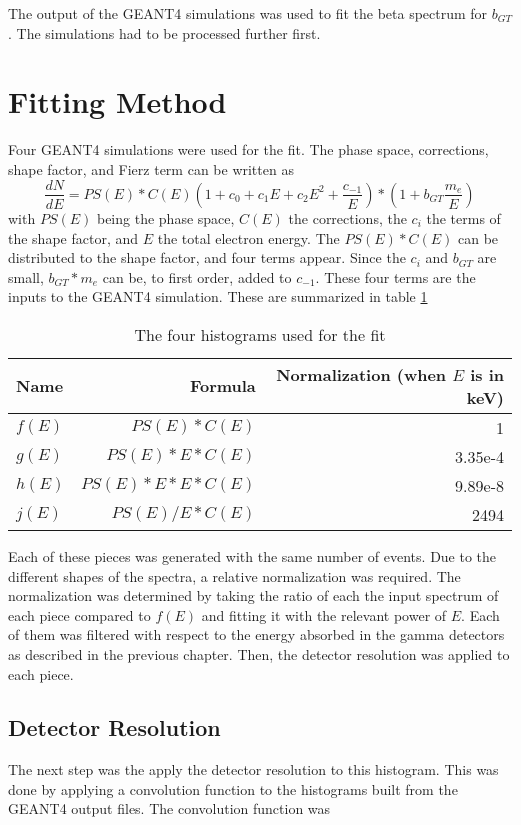 \documentclass[../MaxHughesThesis.tex]{subfiles}
\begin{document}
The output of the GEANT4 simulations was used to fit the beta spectrum for $b_{GT}$.
The simulations had to be processed further first.  

\section{Fitting Method}
Four GEANT4 simulations were used for the fit.
The phase space, corrections, shape factor, and Fierz term can be written as
\begin{equation}
	\frac{dN}{dE}= PS(E) * C(E) (1 + c_{0} + c_{1} E + c_{2} E^{2} + \frac{c_{-1}}{E}) * (1 + b_{GT}\frac{m_{e}}{E})
	\label{eq:betaspecwshape}
\end{equation}
with $PS(E)$ being the phase space, $C(E)$ the corrections, the $c_{i}$ the terms of the shape factor, and $E$ the total electron energy. 
The $PS(E)*C(E)$ can be distributed to the shape factor, and four terms appear.
Since the $c_{i}$ and $b_{GT}$ are small, $b_{GT}*m_{e}$ can be, to first order, added to $c_{-1}$. 
These four terms are the inputs to the GEANT4 simulation.
These are summarized in table \ref{tab:4histfit}

\begin{table}[!hbt]
	\centering
	\caption{The four histograms used for the fit}
		\begin{tabular}{lrr}
		Name & Formula & Normalization (when $E$ is in keV) \\ \hline
		$f(E)$ & $PS(E) * C(E)$ & 1 \\
		$g(E)$ & $PS(E) * E * C(E)$ & 3.35e-4 \\
		$h(E)$ &  $PS(E)  * E * E * C(E)$ & 9.89e-8 \\
		$j(E)$ &  $PS(E)/E * C(E)$ & 2494 
		\end{tabular}
		\label{tab:4histfit}
\end{table}

Each of these pieces was generated with the same number of events.
Due to the different shapes of the spectra, a relative normalization was required.
The normalization was determined by taking the ratio of each the input spectrum of each piece compared to $f(E)$ and fitting it with the relevant power of $E$. 
Each of them was filtered with respect to the energy absorbed in the gamma detectors as described in the previous chapter.
Then, the detector resolution was applied to each piece.

\subsection{Detector Resolution}
\label{sec:convolution}
The next step was the apply the detector resolution to this histogram.
This was done by applying a convolution function to the histograms built from the GEANT4 output files.
The convolution function was
\end{document}
